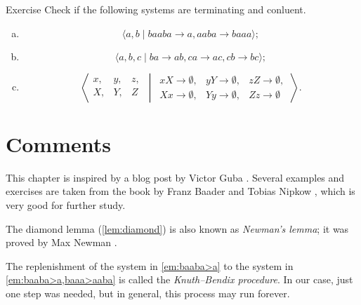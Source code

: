 \begin{thm}{Exercise}\label{ex:complete}
Check if the following systems are terminating and conluent.

\begin{enumerate}[(a)]
 \item\label{ex:complete:a} \[\langle a, b \mid baaba\to a, aaba \to  baaa\rangle;\]
 \item\label{ex:complete:b} \[\langle a,b,c \mid ba\to ab, ca\to ac, cb\to bc \rangle;\]
 \item\label{ex:complete:c} \[\left\langle
\begin{matrix}
x,&y,&z,
\\
X,&Y,&Z
\end{matrix}
\,
\middle| 
\,
\begin{matrix}
xX\to \emptyset,& yY\to \emptyset,& zZ\to \emptyset,
\\
Xx\to \emptyset,& Yy\to \emptyset,& Zz\to \emptyset
\end{matrix}
\,
\right\rangle.\]
\end{enumerate}

\end{thm}

\section{Comments}

This chapter is inspired by a blog post by Victor Guba \cite{guba}.
Several examples and exercises are taken from the book by Franz Baader and Tobias Nipkow \cite{baader-nipkow},
which is very good for further study.

The diamond lemma (\ref{lem:diamond}) is also known as \emph{Newman's lemma};
it was proved by Max Newman \cite[Theorem 3]{newman}.

The replenishment of the system in \ref{em:baaba>a} to the system in \ref{em:baaba>a,baaa>aaba} is called  the \emph{Knuth--Bendix procedure}.
In our case, just one step was needed, but in general, this process may run forever.




